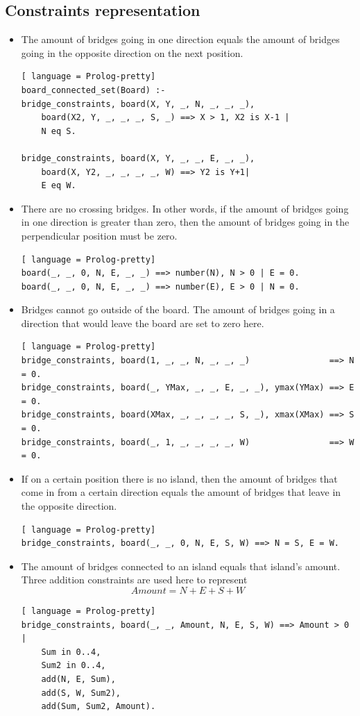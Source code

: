 \documentclass{report}
\begin{document}
\subsection{Constraints representation}
\begin{itemize}
	\item The amount of bridges going in one direction equals the amount of bridges going in the opposite direction on the next position.
\begin{lstlisting}[ language = Prolog-pretty]
board_connected_set(Board) :-
bridge_constraints, board(X, Y, _, N, _, _, _),
    board(X2, Y, _, _, _, S, _) ==> X > 1, X2 is X-1 |
    N eq S.

bridge_constraints, board(X, Y, _, _, E, _, _),
    board(X, Y2, _, _, _, _, W) ==> Y2 is Y+1|
    E eq W.
\end{lstlisting}

	\item There are no crossing bridges. In other words, if the amount of bridges going in one direction is greater than zero, then the amount of bridges going in the perpendicular position must be zero.
\begin{lstlisting}[ language = Prolog-pretty]
board(_, _, 0, N, E, _, _) ==> number(N), N > 0 | E = 0.
board(_, _, 0, N, E, _, _) ==> number(E), E > 0 | N = 0.
\end{lstlisting}

\item Bridges cannot go outside of the board. The amount of bridges going in a direction that would leave the board are set to zero here.
\begin{lstlisting}[ language = Prolog-pretty]
bridge_constraints, board(1, _, _, N, _, _, _)                ==> N = 0.
bridge_constraints, board(_, YMax, _, _, E, _, _), ymax(YMax) ==> E = 0.
bridge_constraints, board(XMax, _, _, _, _, S, _), xmax(XMax) ==> S = 0.
bridge_constraints, board(_, 1, _, _, _, _, W)                ==> W = 0.
\end{lstlisting}
\item If on a certain position there is no island, then the amount of bridges that come in from a certain direction equals the amount of bridges that leave in the opposite direction.
\begin{lstlisting}[ language = Prolog-pretty]
bridge_constraints, board(_, _, 0, N, E, S, W) ==> N = S, E = W.
\end{lstlisting}
\item The amount of bridges connected to an island equals that island's amount. Three addition constraints are used here to represent \[ Amount = N + E + S + W \]
	    \begin{lstlisting}[ language = Prolog-pretty]
bridge_constraints, board(_, _, Amount, N, E, S, W) ==> Amount > 0 |
    Sum in 0..4,
    Sum2 in 0..4,
    add(N, E, Sum),
    add(S, W, Sum2),
    add(Sum, Sum2, Amount).
\end{lstlisting}
\end{itemize}
\end{document}
